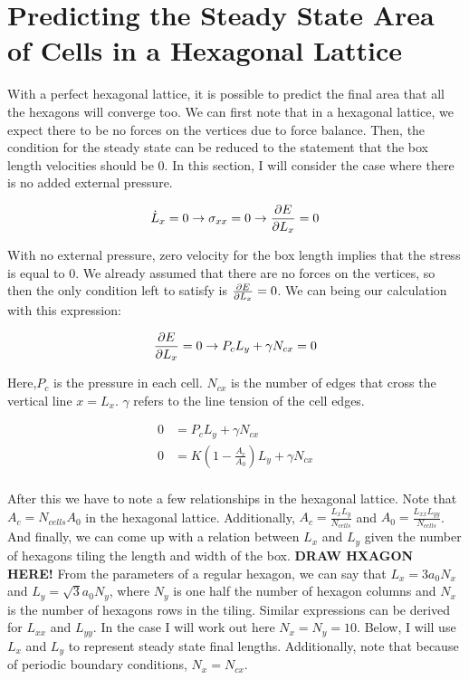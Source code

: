 \documentclass[12pt]{article}
\begin{document}
\section{Predicting the Steady State Area of Cells in a Hexagonal Lattice}
With a perfect hexagonal lattice, it is possible to predict the final area that all the hexagons will converge too. We can first note that in a hexagonal lattice, we expect there to be no forces on the vertices due to force balance. Then, the condition for the steady state can be reduced to the statement that the box length velocities should be $0$. In this section, I will consider the case where there is no added external pressure.
\begin{center}
\begin{equation}
\dot{L}_x = 0 \rightarrow \sigma_{xx} = 0 \rightarrow \pdv{E}{L_x} = 0
\end{equation}
\end{center}
With no external pressure, zero velocity for the box length implies that the stress is equal to $0$. We already assumed that there are no forces on the vertices, so then the only condition left to satisfy is $\pdv{E}{L_x} = 0$. We can being our calculation with this expression:
\begin{center}
\begin{equation}
\begin{split}
\pdv{E}{L_x} = 0 &\rightarrow P_c L_y + \gamma N_{cx}= 0\\
\end{split}
\end{equation}
\end{center}
Here,$P_c$ is the pressure in each cell. $N_{cx}$ is the number of edges that cross the vertical line $x = L_x$. $\gamma$ refers to the line tension of the cell edges. 
\begin{center}
\begin{equation}
\begin{split}
0 &= P_c L_y + \gamma N_{cx} \\
0 &= K (1 - \frac{A_c}{A_0}) L_y + \gamma N_{cx}\\
\end{split}
\end{equation}
\end{center}
After this we have to note a few relationships in the hexagonal lattice. Note that $A_c = N_{cells} A_0$ in the hexagonal lattice. Additionally, $A_c = \frac{L_x L_y}{N_{cells}}$ and $A_0 = \frac{L_{xx} L_{yy}}{N_{cells}}$. And finally, we can come up with a relation between $L_x$ and $L_y$ given the number of hexagons tiling the length and width of the box. \textbf{DRAW HXAGON HERE!} From the parameters of a regular hexagon, we can say that $L_x = 3 a_0 N_x$ and $L_y = \sqrt{3} a_0 N_y$, where $N_y$ is one half the number of hexagon columns and $N_x$ is the number of hexagons rows in the tiling. Similar expressions can be derived for $L_{xx}$ and $L_{yy}$. In the case I will work out here $N_x = N_y = 10$. Below, I will use $L_x$ and $L_y$ to represent steady state final lengths. Additionally, note that because of periodic boundary conditions, $N_x = N_{cx}$. 
\end{document}
